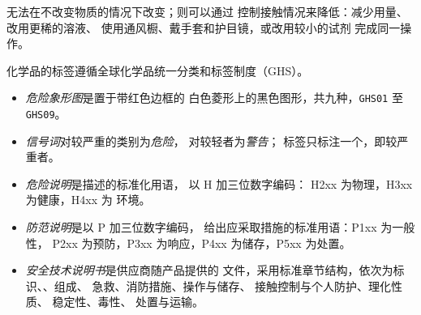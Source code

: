 无法在不改变物质的情况下改变；则可以通过
控制接触情况来降低：减少用量、改用更稀的溶液、
使用通风橱、戴手套和护目镜，或改用较小的试剂
完成同一操作。

\begin{definition}[GHS 标签]\label{def:b1:lab-techniques-1:ghs}
化学品的标签遵循全球化学品统一分类和标签制度（GHS）。
\begin{itemize}
  \item \emph{危险象形图}是置于带红色边框的
        白色菱形上的黑色图形，共九种，\texttt{GHS01}
        至\texttt{GHS09}。
  \item \emph{信号词}对较严重的类别为\emph{危险}，
        对较轻者为\emph{警告}；
        标签只标注一个，即较严重者。
  \item \emph{危险说明}是描述的标准化用语，
        以 H 加三位数字编码：
        H2xx 为物理，H3xx 为健康，H4xx 为
        环境。
  \item \emph{防范说明}是以 P 加三位数字编码，
        给出应采取措施的标准用语：P1xx 为一般性，
        P2xx 为预防，P3xx 为响应，P4xx 为储存，P5xx 为处置。
  \item \emph{安全技术说明书}是供应商随产品提供的
        文件，采用标准章节结构，依次为标识、、组成、
        急救、消防措施、操作与储存、
        接触控制与个人防护、理化性质、
        稳定性、毒性、
        处置与运输。
\end{itemize}
\end{definition}

